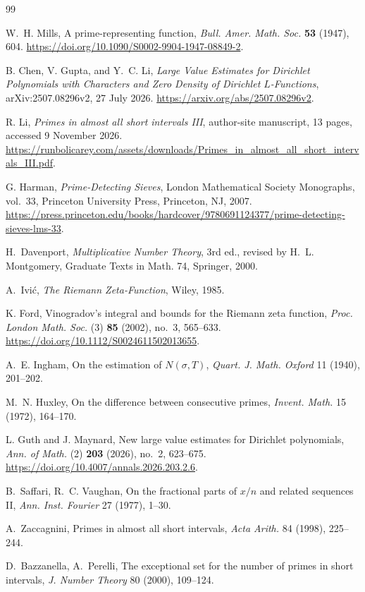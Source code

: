 \begin{thebibliography}{99}\small\raggedright
{}
W.~H. Mills, A prime-representing function,
\emph{Bull. Amer. Math. Soc.} \textbf{53} (1947), 604.
\url{https://doi.org/10.1090/S0002-9904-1947-08849-2}.

B. Chen, V. Gupta, and Y.~C. Li,
\emph{Large Value Estimates for Dirichlet Polynomials with Characters
and Zero Density of Dirichlet $L$-Functions},
arXiv:2507.08296v2, 27 July 2026.
\url{https://arxiv.org/abs/2507.08296v2}.

R. Li, \emph{Primes in almost all short intervals III},
author-site manuscript, 13 pages, accessed 9 November 2026.
\url{https://runbolicarey.com/assets/downloads/Primes_in_almost_all_short_intervals_III.pdf}.

G. Harman, \emph{Prime-Detecting Sieves},
London Mathematical Society Monographs, vol.~33,
Princeton University Press, Princeton, NJ, 2007.
\url{https://press.princeton.edu/books/hardcover/9780691124377/prime-detecting-sieves-lms-33}.

 H.~Davenport, \emph{Multiplicative Number Theory}, 3rd ed., revised by H.~L. Montgomery, Graduate Texts in Math. 74, Springer, 2000.

 A.~Ivi\'c, \emph{The Riemann Zeta-Function}, Wiley, 1985.

K. Ford, Vinogradov's integral and bounds for the Riemann zeta function,
\emph{Proc. London Math. Soc.} (3) \textbf{85} (2002), no.~3, 565--633.
\url{https://doi.org/10.1112/S0024611502013655}.

 A.~E. Ingham, On the estimation of $N(\sigma,T)$, \emph{Quart. J. Math. Oxford} 11 (1940), 201--202.

 M.~N. Huxley, On the difference between consecutive primes, \emph{Invent. Math.} 15 (1972), 164--170.

L. Guth and J. Maynard, New large value estimates for Dirichlet polynomials,
\emph{Ann. of Math.} (2) \textbf{203} (2026), no.~2, 623--675.
\url{https://doi.org/10.4007/annals.2026.203.2.6}.

 B.~Saffari, R.~C. Vaughan, On the fractional parts of $x/n$ and related sequences II, \emph{Ann. Inst. Fourier} 27 (1977), 1--30.

 A.~Zaccagnini, Primes in almost all short intervals, \emph{Acta Arith.} 84 (1998), 225--244.

 D.~Bazzanella, A.~Perelli, The exceptional set for the number of primes in short intervals, \emph{J. Number Theory} 80 (2000), 109--124.


\end{thebibliography}
